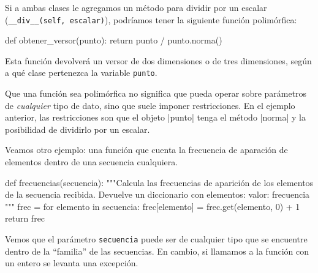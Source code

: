 Si a ambas clases le agregamos un método para dividir por un escalar
(\lstinline!__div__(self, escalar)!), podríamos tener la siguiente función
polimórfica:

\begin{codigo-python-sn}
def obtener_versor(punto):
    return punto / punto.norma()
\end{codigo-python-sn}

Esta función devolverá un versor de dos dimensiones o de tres dimensiones,
según a qué clase pertenezca la variable \lstinline!punto!.

\begin{atencion}
Que una función sea polimórfica no significa que pueda operar sobre parámetros
de {\it cualquier} tipo de dato, sino que suele imponer restricciones.  En el
ejemplo anterior, las restricciones son que el objeto |punto| tenga el método
|norma| y la posibilidad de dividirlo por un escalar.
\end{atencion}

Veamos otro ejemplo: una función que cuenta la frecuencia de aparación de
elementos dentro de una secuencia cualquiera.

\begin{codigo-python-sn}
def frecuencias(secuencia):
    """Calcula las frecuencias de aparición de los elementos de
       la secuencia recibida.
       Devuelve un diccionario con elementos: {valor: frecuencia}
    """
    frec = {}
    for elemento in secuencia:
        frec[elemento] = frec.get(elemento, 0) + 1
    return frec
\end{codigo-python-sn}

Vemos que el parámetro \lstinline!secuencia! puede ser de cualquier tipo
que se encuentre dentro de la ``familia'' de las secuencias. En cambio, si
llamamos a la función con un entero se levanta una excepción.


